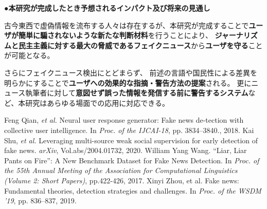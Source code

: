 {	\noindent
	●\textbf{本研究が完成したとき予想されるインパクト及び将来の見通し}

	古今東西で虚偽情報を流布する人々は存在するが、本研究が完成することで\textbf{ユーザが簡単に騙されないような新たな判断材料}を行うことにより、
	\textbf{ジャーナリズムと民主主義に対する最大の脅威であるフェイクニュース}\cite{zhou2019wsdm}から\textbf{ユーザを守る}ことが可能となる。

	さらにフェイクニュース検出にとどまらず、
	前述の言語や国民性による差異を明らかにすることで\textbf{ユーザへの効果的な指摘・警告方法の提案}される。
	更にニュース執筆者に対して\textbf{意図せず誤った情報を発信する前に警告するシステム}など、本研究はあらゆる場面での応用に対応できる。
	

	{\footnotesize
		\begin{thebibliography}{99}
			\setcounter{enumiv}{7}
			\vspace*{-2mm}
			\setlength{\parskip}{0cm}
			\setlength{\itemsep}{0cm}
			\begin{spacing}{0.7}
				 Feng Qian, \textit{et al.} Neural user response generator: Fake news de-tection with collective user intelligence. In \textit{Proc. of the IJCAI-18}, pp. 3834–3840., 2018.
				 Kai Shu, \textit{et al.} Leveraging multi-source weak social supervision for early detection of fake news. \textit{arXiv}, Vol.abs/2004.01732, 2020.
				William Yang Wang. ``Liar, Liar Pants on Fire'': A New Benchmark Dataset for Fake News Detection. In \textit{Proc. of the 55th Annual Meeting of the Association for Computational Linguistics (Volume 2: Short Papers)}, pp.422-426, 2017.
				Xinyi Zhou, et al. Fake news: Fundamental theories, detection strategies and challenges. In \textit{Proc. of the WSDM '19}, pp. 836–837, 2019.
			\end{spacing}
		\end{thebibliography}
	}
}

